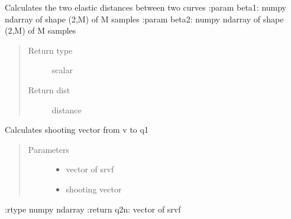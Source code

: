 \documentclass[letterpaper,10pt,english]{sphinxmanual}
\begin{document}

\begin{fulllineitems}
\label{\detokenize{curve_functions:curve_functions.elastic_distance_curve}}
Calculates the two elastic distances between two curves
:param beta1: numpy ndarray of shape (2,M) of M samples
:param beta2: numpy ndarray of shape (2,M) of M samples
\begin{quote}\begin{description}
\item[{Return type}] \leavevmode
scalar

\item[{Return dist}] \leavevmode
distance

\end{description}\end{quote}

\end{fulllineitems}


\begin{fulllineitems}
\label{\detokenize{curve_functions:curve_functions.elastic_shooting}}
Calculates shooting vector from v to q1
\begin{quote}\begin{description}
\item[{Parameters}] \leavevmode\begin{itemize}
\item {} 
 \textendash{} vector of srvf

\item {} 
 \textendash{} shooting vector

\end{itemize}

\end{description}\end{quote}

:rtype numpy ndarray
:return q2n: vector of srvf

\end{fulllineitems}
\end{document}
